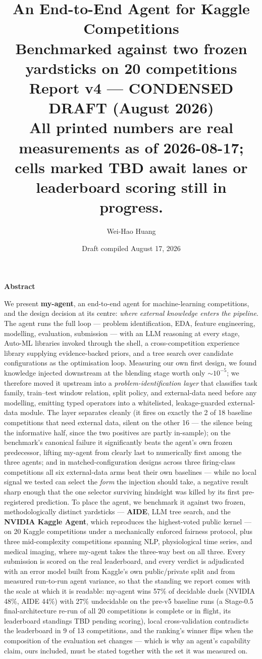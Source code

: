 \documentclass[11pt,a4paper]{article}
\title{\textbf{An End-to-End Agent for Kaggle Competitions}\\
\large Benchmarked against two frozen yardsticks on 20 competitions\\
Report v4 --- CONDENSED DRAFT (August 2026)\\
\normalsize\textcolor{orange!85!black}{All printed numbers are real measurements as of 2026-08-17; cells marked TBD await lanes or leaderboard scoring still in progress.}}
\author{Wei-Hao Huang}
\date{Draft compiled August 17, 2026}
\begin{document}
\maketitle

\begin{center}\textbf{\large Abstract}\end{center}
\noindent We present \textbf{my-agent}, an end-to-end agent for machine-learning competitions, and the design decision at its centre: \emph{where external knowledge enters the pipeline}. The agent runs the full loop --- problem identification, EDA, feature engineering, modelling, evaluation, submission --- with an LLM reasoning at every stage, Auto-ML libraries invoked through the shell, a cross-competition experience library supplying evidence-backed priors, and a tree search over candidate configurations as the optimisation loop. Measuring our own first design, we found knowledge injected downstream at the blending stage worth only ${\sim}10^{-5}$; we therefore moved it upstream into a \emph{problem-identification layer} that classifies task family, train--test window relation, split policy, and external-data need before any modelling, emitting typed operators into a whitelisted, leakage-guarded external-data module. The layer separates cleanly (it fires on exactly the 2 of 18 baseline competitions that need external data, silent on the other 16 --- the silence being the informative half, since the two positives are partly in-sample); on the benchmark's canonical failure it significantly beats the agent's own frozen predecessor, lifting my-agent from clearly last to numerically first among the three agents; and in matched-configuration designs across three firing-class competitions all six external-data arms beat their own baselines --- while no local signal we tested can select the \emph{form} the injection should take, a negative result sharp enough that the one selector surviving hindsight was killed by its first pre-registered prediction. To place the agent, we benchmark it against two frozen, methodologically distinct yardsticks --- \textbf{AIDE}, LLM tree search, and the \textbf{NVIDIA Kaggle Agent}, which reproduces the highest-voted public kernel --- on 20 Kaggle competitions under a mechanically enforced fairness protocol, plus three mid-complexity competitions spanning NLP, physiological time series, and medical imaging, where my-agent takes the three-way best on all three. Every submission is scored on the real leaderboard, and every verdict is adjudicated with an error model built from Kaggle's own public/private split and from measured run-to-run agent variance, so that the standing we report comes with the scale at which it is readable: my-agent wins 57\% of decidable duels (NVIDIA 48\%, AIDE 44\%) with 27\% undecidable on the pre-v5 baseline runs (a Stage-0.5 final-architecture re-run of all 20 competitions is complete or in flight, its leaderboard standings TBD pending scoring), local cross-validation contradicts the leaderboard in 9 of 13 competitions, and the ranking's winner flips when the composition of the evaluation set changes --- which is why an agent's capability claim, ours included, must be stated together with the set it was measured on.
\end{document}
